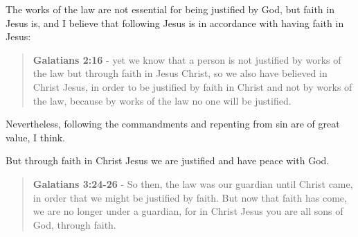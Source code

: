 \documentclass[11pt]{article}
\begin{document}
The works of the law are not essential for being justified by God, but faith in Jesus is, and I believe that following Jesus is in accordance with having faith in Jesus:

\begin{quote}
\textbf{Galatians 2:16} - yet we know that a person is not justified by works of the law but through faith in Jesus Christ, so we also have believed in Christ Jesus, in order to be justified by faith in Christ and not by works of the law, because by works of the law no one will be justified.
\end{quote}

Nevertheless, following the commandments and repenting from sin are of great value, I think.

But through faith in Christ Jesus we are justified and have peace with God.

\begin{quote}
\textbf{Galatians 3:24-26} - So then, the law was our guardian until Christ came, in order that we might be justified by faith. But now that faith has come, we are no longer under a guardian, for in Christ Jesus you are all sons of God, through faith.
\end{quote}
\end{document}
